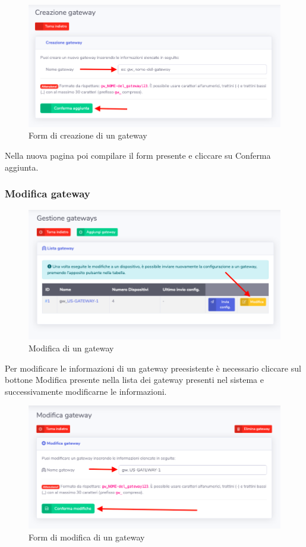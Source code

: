 		\begin{figure}[H]
		\centering
		\includegraphics[scale=0.600]{res/images/admin/creazGateway.png}
		\caption{Form di creazione di un gateway}
	\end{figure}


		Nella nuova pagina poi compilare il form presente e cliccare su Conferma aggiunta. 

	\subsubsection{Modifica gateway}

		\begin{figure}[H]
		\centering
		\includegraphics[scale=0.600]{res/images/admin/selModGateway.png}
		\caption{Modifica di un gateway}
	\end{figure}

		Per modificare le informazioni di un gateway preesistente è necessario cliccare sul bottone Modifica presente nella lista dei gateway presenti nel sistema e successivamente modificarne le informazioni.

		\begin{figure}[H]
		\centering
		\includegraphics[scale=0.600]{res/images/admin/modGateway.png}
		\caption{Form di modifica di un gateway}
	\end{figure}

